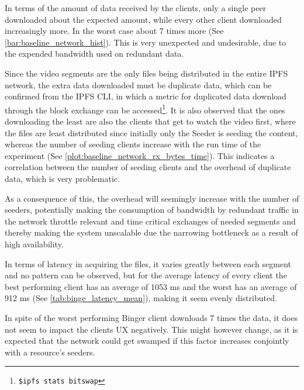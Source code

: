 

In terms of the amount of data received by the clients, only a single peer downloaded about the expected amount, while every other client downloaded increasingly more. In the worst case about 7 times more (See \autoref{bar:baseline_network_hist}). This is very unexpected and undesirable, due to the expended bandwidth used on redundant data.



Since the video segments are the only files being distributed in the entire \ac{IPFS} network, the extra data downloaded must be duplicate data, which can be confirmed from the \ac{IPFS} \ac{CLI}, in which a metric for duplicated data download through the block exchange can be accessed\footnote{\texttt{\$ipfs stats bitswap}}. It is also observed that the ones downloading the least are also the clients that get to watch the video first, where the files are least distributed since initially only the Seeder is seeding the content, whereas the number of seeding clients increase with the run time of the experiment (See \autoref{plot:baseline_network_rx_bytes_time}). This indicates a correlation between the number of seeding clients and the overhead of duplicate data, which is very problematic.

As a consequence of this, the overhead will seemingly increase with the number of seeders, potentially making the consumption of bandwidth by redundant traffic in the network throttle relevant and time critical exchanges of needed segments and thereby making the system unscalable due the narrowing bottleneck as a result of high availability.



In terms of latency in acquiring the files, it varies greatly between each segment and no pattern can be observed, but for the average latency of every client the best performing client has an average of 1053 \ac{ms} and the worst has an average of 912 \ac{ms} (See \autoref{tab:binge_latency_mean}), making it seem evenly distributed.



In spite of the worst performing Binger client downloads 7 times the data, it does not seem to impact the clients \ac{UX} negatively. This might however change, as it is expected that the network could get swamped if this factor increases conjointly with a resource's seeders.

